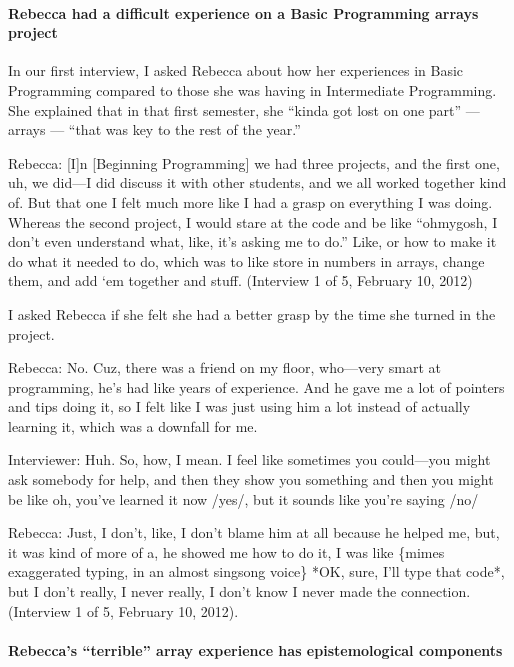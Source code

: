 \paragraph{Rebecca had a difficult experience on a Basic Programming
arrays
project}\label{rebecca-had-a-difficult-experience-on-a-basic-programming-arrays-project}

In our first interview, I asked Rebecca about how her experiences in
Basic Programming compared to those she was having in Intermediate
Programming. She explained that in that first semester, she ``kinda got
lost on one part'' --- arrays --- ``that was key to the rest of the
year.''

Rebecca: {[}I{]}n {[}Beginning Programming{]} we had three projects, and
the first one, uh, we did---I did discuss it with other students, and we
all worked together kind of. But that one I felt much more like I had a
grasp on everything I was doing. Whereas the second project, I would
stare at the code and be like ``ohmygosh, I don't even understand what,
like, it's asking me to do.'' Like, or how to make it do what it needed
to do, which was to like store in numbers in arrays, change them, and
add `em together and stuff. (Interview 1 of 5, February 10, 2012)

I asked Rebecca if she felt she had a better grasp by the time she
turned in the project.

Rebecca: No. Cuz, there was a friend on my floor, who---very smart at
programming, he's had like years of experience. And he gave me a lot of
pointers and tips doing it, so I felt like I was just using him a lot
instead of actually learning it, which was a downfall for me.

Interviewer: Huh. So, how, I mean. I feel like sometimes you could---you
might ask somebody for help, and then they show you something and then
you might be like oh, you've learned it now /yes/, but it sounds like
you're saying /no/

Rebecca: Just, I don't, like, I don't blame him at all because he helped
me, but, it was kind of more of a, he showed me how to do it, I was like
\{mimes exaggerated typing, in an almost singsong voice\} *OK, sure,
I'll type that code*, but I don't really, I never really, I don't know I
never made the connection. (Interview 1 of 5, February 10, 2012).

\paragraph{Rebecca's ``terrible'' array experience has epistemological
components}\label{rebeccas-terrible-array-experience-has-epistemological-components}

